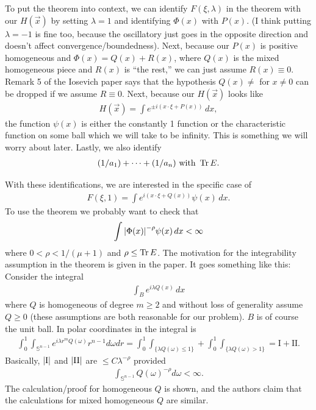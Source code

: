 \documentclass{article}
\theoremstyle{definition}
\begin{document}
\noindent To put the theorem into context, we can identify $F(\xi,\lambda)$ in the theorem with our $H(\vec{x})$ by setting $\lambda = 1$ and identifying $\Phi(x)$ with $P(x)$. (I think putting $\lambda = -1$ is fine too, because the oscillatory just goes in the opposite direction and doesn't affect convergence/boundedness). Next, because our $P(x)$ is positive homogeneous and $\Phi(x) = Q(x) + R(x)$, where $Q(x)$ is the mixed homogeneous piece and $R(x)$ is ``the rest,'' we can just assume $R(x) \equiv 0$. Remark 5 of the Iosevich paper says that the hypothesis $Q(x) \neq $ for $x\neq 0$ can be dropped if we assume $R \equiv 0$. Next, because our $H(\vec{x})$ looks like
\begin{align*}
    H(\vec{x}) = \int e^{\pm i(x\cdot \xi + P(x))}\,dx,
\end{align*}
the function $\psi(x)$ is either the constantly 1 function or the characteristic function on some ball which we will take to be infinity. This is something we will worry about later. Lastly, we also identify
\begin{align*}
    (1/a_1) + \dots + (1/a_n) \mbox{ with } \Tr E.
\end{align*}


With these identifications, we are interested in the specific case of 
\begin{align*}
    F(\xi, 1) = \int e^{i(x\cdot \xi + Q(x))}\psi(x)\,dx. 
\end{align*}
To use the theorem we probably want to check that 
\begin{align*}
    \int \abs{\Phi(x)}^{-\rho} \psi(x)\,dx < \infty
\end{align*}
where $0 < \rho < 1/(\mu+1)$ and $\rho \leq \Tr E $. The motivation for the integrability assumption in the theorem is given in the paper. It goes something like this:\\

Consider the integral
\begin{align*}
    \int_B e^{i\lambda Q(x)}\,dx
\end{align*}
where $Q$ is homogeneous of degree $m \geq 2$ and without loss of generality assume $Q \geq 0$ (these assumptions are both reasonable for our problem). $B$ is of course the unit ball. In polar coordinates in the integral is
\begin{align*}
    \int^1_0 \int_{\mathbb{S}^{n-1}}e^{i\lambda r^m Q(\omega)}r^{n-1}d\omega dr = \int^1_0 \int_{\{ \lambda Q(\omega) \leq 1 \}} + \int^1_0 \int_{\{ \lambda Q(\omega) > 1 \}} = \mbox{I} + \mbox{II}.
\end{align*}
Basically, $\abs{\mbox{I}}$ and $\abs{\mbox{II}}$ are $\leq C\lambda^{-\rho}$ provided 
\begin{align*}
    \int_{\mathbb{S}^{n-1}} Q(\omega)^{-\rho}d\omega < \infty.
\end{align*}
The calculation/proof for homogeneous $Q$ is shown, and the authors claim that the calculations for mixed homogeneous $Q$ are similar. \\
\end{document}
